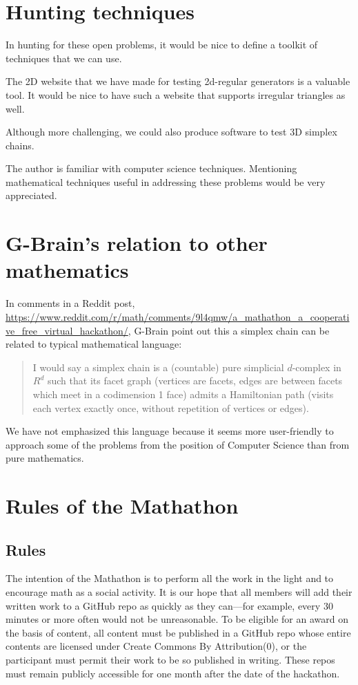 \documentclass[11pt]{article}
\begin{document}
\section{Hunting techniques}

In hunting for these open problems, it would be nice to define a toolkit of techniques that we can use.

The 2D website that we have made for testing 2d-regular generators is a valuable tool.
It would be nice to have such a website that supports irregular triangles as well.

Although more challenging, we could also produce software to test 3D simplex chains.

The author is familiar with computer science techniques. Mentioning mathematical techniques useful in addressing these problems would be
very appreciated.

\section{G-Brain's relation to other mathematics}

In comments in a Reddit post, \url{https://www.reddit.com/r/math/comments/9l4qmw/a_mathathon_a_cooperative_free_virtual_hackathon/},
G-Brain point out this a simplex chain can be related to typical mathematical language:
\begin{quote}
  I would say a simplex chain is a (countable) pure simplicial $d$-complex in $R^d$ such that its facet graph (vertices are facets, edges are between facets which meet in a codimension 1 face) admits a Hamiltonian path (visits each vertex exactly once, without repetition of vertices or edges).
\end{quote}
We have not emphasized this language because it seems more user-friendly to approach some of the problems from the position of Computer Science than from pure mathematics.

\section{Rules of the Mathathon}

\subsection{Rules}

The intention of the Mathathon is to perform all the work in the light and to encourage math
as a social activity.
It is our hope that all members will add their written work to a GitHub repo as quickly
as they can---for example, every 30 minutes or more often would not be unreasonable.
To be eligible for an award on the basis of content, all content must be published in a GitHub repo
whose entire contents are licensed under Create Commons By Attribution(0), or the
participant must permit their work to be so published in writing.
These repos must remain publicly accessible for one month after the date of the hackathon.
\end{document}
